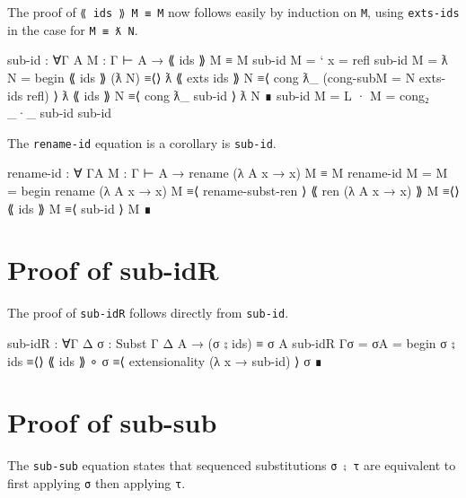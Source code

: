 The proof of \texttt{⟪\ ids\ ⟫\ M\ ≡\ M} now follows easily by induction
on \texttt{M}, using \texttt{exts-ids} in the case for
\texttt{M\ ≡\ ƛ\ N}.

\begin{fence}
\begin{code}
sub-id : ∀{Γ} {A} {M : Γ ⊢ A}
         → ⟪ ids ⟫ M ≡ M
sub-id {M = ` x} = refl
sub-id {M = ƛ N} =
   begin
     ⟪ ids ⟫ (ƛ N)
   ≡⟨⟩
     ƛ ⟪ exts ids ⟫ N
   ≡⟨ cong ƛ_ (cong-sub{M = N} exts-ids refl)  ⟩
     ƛ ⟪ ids ⟫ N
   ≡⟨ cong ƛ_ sub-id ⟩
     ƛ N
   ∎
sub-id {M = L · M} = cong₂ _·_ sub-id sub-id
\end{code}
\end{fence}

The \texttt{rename-id} equation is a corollary is \texttt{sub-id}.

\begin{fence}
\begin{code}
rename-id : ∀ {Γ}{A} {M : Γ ⊢ A}
  → rename (λ {A} x → x) M ≡ M
rename-id {M = M} =
   begin
     rename (λ {A} x → x) M
   ≡⟨ rename-subst-ren  ⟩
     ⟪ ren (λ {A} x → x) ⟫ M
   ≡⟨⟩
     ⟪ ids ⟫ M
   ≡⟨ sub-id  ⟩
     M
   ∎
\end{code}
\end{fence}

\hypertarget{proof-of-sub-idr}{%
\section{Proof of sub-idR}\label{proof-of-sub-idr}}

The proof of \texttt{sub-idR} follows directly from \texttt{sub-id}.

\begin{fence}
\begin{code}
sub-idR : ∀{Γ Δ} {σ : Subst Γ Δ} {A}
       → (σ ⨟ ids) ≡ σ {A}
sub-idR {Γ}{σ = σ}{A} =
          begin
            σ ⨟ ids
          ≡⟨⟩
            ⟪ ids ⟫ ∘ σ
          ≡⟨ extensionality (λ x → sub-id) ⟩
            σ
          ∎
\end{code}
\end{fence}

\hypertarget{proof-of-sub-sub}{%
\section{Proof of sub-sub}\label{proof-of-sub-sub}}

The \texttt{sub-sub} equation states that sequenced substitutions
\texttt{σ\ ⨟\ τ} are equivalent to first applying \texttt{σ} then
applying \texttt{τ}.

